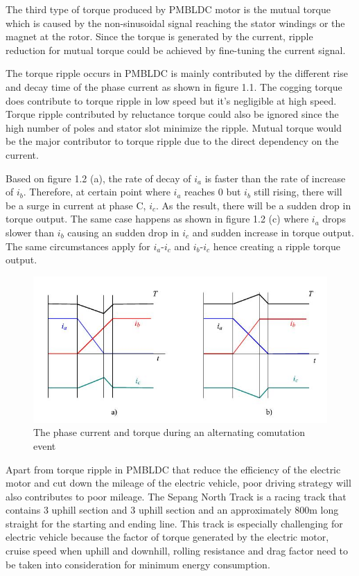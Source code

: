 The third type of torque produced by PMBLDC motor is the mutual torque which is caused by the non-sinusoidal signal reaching the stator windings or the magnet at the rotor. Since the torque is generated by the current, ripple reduction for mutual torque could be achieved by fine-tuning the current signal.

The torque ripple occurs in PMBLDC is mainly contributed by the different rise and decay time of the phase current as shown in figure 1.1. The cogging torque does contribute to torque ripple in low speed but it's negligible at high speed. Torque ripple contributed by reluctance torque could also be ignored since the high number of poles and stator slot minimize the ripple. Mutual torque would be the major contributor to torque ripple due to the direct dependency on the current.

Based on figure 1.2 (a), the rate of decay of $i_a$ is faster than the rate of increase of $i_b$. Therefore, at certain point where $i_a$ reaches 0 but $i_b$ still rising, there will be a surge in current at phase C, $i_c$. As the result, there will be a sudden drop in torque output. The same case happens as shown in figure 1.2 (c) where $i_a$ drops slower than $i_b$ causing an sudden drop in $i_c$ and sudden increase in torque output. The same circumstances apply for $i_a$-$i_c$ and $i_b$-$i_c$ hence creating a ripple torque output. 

\begin{figure}[htb]
	\centering
	\includegraphics[width=5.5in]{images/phase_current.jpg}
	\caption{The phase current and torque during an alternating comutation event  \citep{7648}}
\end{figure}

Apart from torque ripple in PMBLDC that reduce the efficiency of the electric motor and cut down the mileage of the electric vehicle, poor driving strategy will also contributes to poor mileage. The Sepang North Track is a racing track that contains 3 uphill section and 3 uphill section and an approximately 800m long straight for the starting and ending line. This track is especially challenging for electric vehicle because the factor of torque generated by the electric motor, cruise speed when uphill and downhill, rolling resistance and drag factor need to be taken into consideration for minimum energy consumption.

